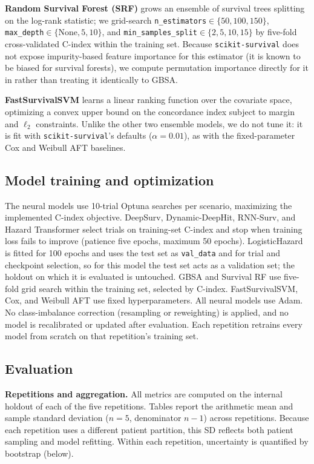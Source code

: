\documentclass[10pt,letterpaper]{article}
\begin{document}
\textbf{Random Survival Forest (SRF)} \cite{pickett2021random_survival_forests,ishwaran2008random} grows an ensemble of survival trees splitting on the log-rank statistic; we grid-search \texttt{n\_estimators}$\in\{50,100,150\}$, \texttt{max\_depth}$\in\{\text{None},5,10\}$, and \texttt{min\_samples\_split}$\in\{2,5,10,15\}$ by five-fold cross-validated C-index within the training set. Because \texttt{scikit-survival} does not expose impurity-based feature importance for this estimator (it is known to be biased for survival forests), we compute permutation importance directly for it in  rather than treating it identically to GBSA.

\textbf{FastSurvivalSVM} learns a linear ranking function over the covariate space, optimizing a convex upper bound on the concordance index subject to margin and $\ell_2$ constraints. Unlike the other two ensemble models, we do not tune it: it is fit with \texttt{scikit-survival}'s defaults ($\alpha=0.01$), as with the fixed-parameter Cox and Weibull AFT baselines.

\subsection*{Model training and optimization} \label{sec:training}
The neural models use 10-trial Optuna searches per scenario, maximizing the implemented C-index objective. DeepSurv, Dynamic-DeepHit, RNN-Surv, and Hazard Transformer select trials on training-set C-index and stop when training loss fails to improve (patience five epochs, maximum 50 epochs). LogisticHazard is fitted for 100 epochs and uses the test set as \texttt{val\_data} and for trial and checkpoint selection, so for this model the test set acts as a validation set; the holdout on which it is evaluated is untouched. GBSA and Survival RF use five-fold grid search within the training set, selected by C-index. FastSurvivalSVM, Cox, and Weibull AFT use fixed hyperparameters. All neural models use Adam. No class-imbalance correction (resampling or reweighting) is applied, and no model is recalibrated or updated after evaluation. Each repetition retrains every model from scratch on that repetition's training set.

\subsection*{Evaluation} \label{sec:eval}
\textbf{Repetitions and aggregation.} All metrics are computed on the internal holdout of each of the five repetitions. Tables report the arithmetic mean and sample standard deviation ($n=5$, denominator $n-1$) across repetitions. Because each repetition uses a different patient partition, this SD reflects both patient sampling and model refitting. Within each repetition, uncertainty is quantified by bootstrap (below).
\end{document}
